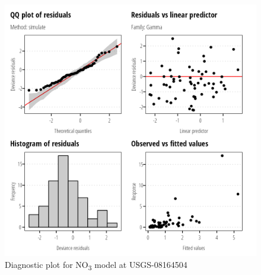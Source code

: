 \documentclass[
]{article}
\begin{document}
\clearpage

\begin{figure}[h]

{\centering \includegraphics{model_assessment_files/figure-pdf/unnamed-chunk-40-1.png}

}

\caption{Diagnostic plot for NO\textsubscript{3} model at USGS-08164504}

\end{figure}
\end{document}
